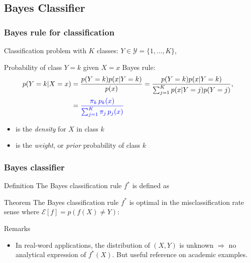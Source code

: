\subsection{Bayes Classifier}

\begin{frame}
  \frametitle{Bayes rule for classification}


Classification problem with $K$ classes: $Y \in \mathcal{Y}=\{1,\ldots,K\}$,

\begin{block}{Probability of class $Y=k$ given $X=x$}
Bayes rule:
  \begin{align*}
 p{(Y=k|X=x)} &=  \frac{ p{(Y=k)}p(x| Y=k) } { p(x) } =
  \frac{p{(Y=k)} p(x| Y=k) } { \sum_{j=1}^K p(x|Y=j)p{(Y=j)}  },\\
  & = {\textcolor{blue}{ \frac{  \pi_k \,  p_k(x) } { \sum_{j=1}^K  \pi_j \,  p_j(x)   } }}
 \end{align*}
 \begin{itemize}
  \item {} is the {\em density} for $X$ in class $k$
  \item {} is the {\em weight}, or {\em prior} probability of class $k$
 \end{itemize}
\end{block}

\end{frame}


\begin{frame}
  \frametitle{Bayes classifier}

  \begin{block}{Definition}
  The Bayes classification rule $f^{\ast}$ is defined as
   \end{block}
 \begin{block}{Theorem}
 The Bayes classification rule $f^{\ast}$ is optimal in the misclassification rate sense where $\mathcal{E}[f]=p( f(X)  \ne Y)$:
 \end{block}
  \begin{block}{Remarks}
   \begin{itemize}
    \item In real-word applications,  the distribution of $(X,Y)$ is unknown $\Rightarrow$ no analytical expression  of $f^{\ast}(X)$.
    But useful reference on academic examples.
   \end{itemize}

 \end{block}
\end{frame}




